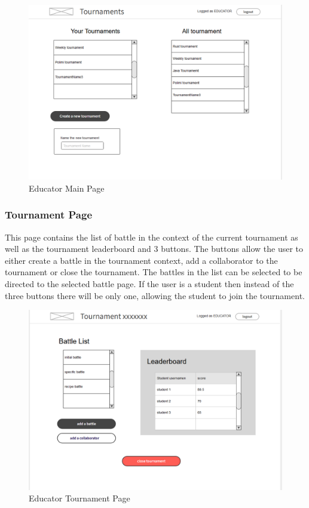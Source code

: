 \begin{figure}[H]
    \centering
    \includegraphics[width=0.8\linewidth]{misc//Images//UI Mockups/eduMain.png}
    \caption{Educator Main Page}
    \label{fig:enter-label}
\end{figure}

\newpage
\subsubsection{Tournament Page}
This page contains the list of battle in the context of the current tournament as well as the tournament leaderboard and 3 buttons.
The buttons allow the user to either create a battle in the tournament context, add a collaborator to the tournament or close the tournament.
The battles in the list can be selected to be directed to the selected battle page.
If the user is a student then instead of the three buttons there will be only one, allowing the student to join the tournament.

\begin{figure}[H]
    \centering
    \includegraphics[width=0.7\linewidth]{misc//Images//UI Mockups/eduTournament.png}
    \caption{Educator Tournament Page}
    \label{fig:enter-label}
\end{figure}

